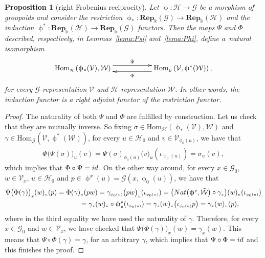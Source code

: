 \documentclass[11pt]{article}
\numberwithin{equation}{section}
\newtheorem{Proposition}[Theorem]{Proposition}
 { \theoremstyle{definition}
\newtheorem{Definition}[Theorem]{Definition}
\newtheorem{Remark}[Theorem]{Remark}
\newtheorem{Example}[Theorem]{Example}
 }
\renewcommand{\hom}[3]{\mathrm{Hom}_{\Sscript{#1}}\left(#2, #3\right)}
\newcommand{\Rep}[1]{\mathbf{Rep}_{\Sscript{\Bbbk}}(#1)}
\newcommand{\Go}{\cG_{\Sscript{0}}}
\newcommand{\Ho}{\cH_{\Sscript{0}}}
\newcommand{\Vx}{\cV_{\Sscript{x}}}
\newcommand{\cG}{{\mathcal G}}
\newcommand{\cH}{{\mathcal H}}
\newcommand{\cV}{{\mathcal V}}
\newcommand{\cW}{{\mathcal W}}
\newcommand{\Sscript}[1]{\scriptscriptstyle{#1}}
\begin{document}
\begin{Proposition}[right Frobenius reciprocity]\label{prop:FrobeniusR} Let $\upphi\colon \cH \to \cG$ be a morphism of groupoids and consider the restriction $\upphi_{*}\colon \Rep{\cG} \to \Rep{\cH}$ and the induction $\upphi^{*}\colon \Rep{\cH} \to \Rep{\cG}$ functors. Then the maps $\Psi$ and $\Phi$ described, respectively, in Lemmas~{\rm \ref{lema:Psi}} and~{\rm \ref{lema:Phi}}, define a~natural isomorphism
\begin{gather*}
\xymatrix@R=0pt{ \hom{\cH}{\upphi_{*}(\cV)}{\cW} \ar@<1ex>@{->}^-{\Psi}[rr] & & \hom{\cG}{\cV}{\upphi^*(\cW)},\ar@<1ex>@{->}^-{\Phi}[ll] }
\end{gather*}
for every $\cG$-representation $\cV$ and $\cH$-representation $\cW$. In other words, the induction functor is a right adjoint functor of the restriction functor.
\end{Proposition}
\begin{proof}The naturality of both $\Psi$ and $\Phi$ are fulfilled by construction. Let us check that they are mutually inverse. So fixing $\sigma \in \hom{\cH}{\upphi_*(\cV)}{\cW}$ and $\gamma \in \hom{\cG}{\cV}{\upphi^*(\cW)}$, for every $u \in \Ho$ and $v \in \cV_{\Sscript{\phi_0(u)}}$, we have that
\begin{gather*}
\Phi\big( \Psi(\sigma)\big)_{\Sscript{u}}(v) =\Psi(\sigma)_{\Sscript{\phi_0(u)}}\big( v\big)_{\Sscript{u}}(\iota_{\Sscript{\upphi_0(u)}}) = \sigma_{\Sscript{u}}(v),
\end{gather*}
which implies that $\Phi \circ \Psi= {\rm id}$. On the other way around, for every $x \in \Go$, $w \in \Vx$, $u \in \Ho$ and $p \in \upphi^{\Sscript{x}}(u)=\cG(x,\upphi_{\Sscript{0}}(u))$, we have that
\begin{gather*}
\Psi\big( \Phi(\gamma)\big)_{\Sscript{x}}(w)_{\Sscript{u}}(p) = \Phi(\gamma)_{\Sscript{u}}(p w) =\gamma_{\Sscript{\phi_{\Sscript{0}}(u)}}\big( p w\big)_{\Sscript{u}}(\iota_{\Sscript{\phi_0(u)}}) =
 \big( {\rm Nat}\big(\upphi^{\Sscript{p}}, \tilde{\cW}\big) \circ \gamma_{\Sscript{x}}\big)(w)_{\Sscript{u}}(\iota_{\Sscript{\phi_0(u)}})\\
\hphantom{\Psi\big( \Phi(\gamma)\big)_{\Sscript{x}}(w)_{\Sscript{u}}(p)}{}
 = \gamma_{\Sscript{x}}(w)_{\Sscript{u}} \circ \upphi^{\Sscript{p}}_{\Sscript{u}}(\iota_{\Sscript{\phi_0(u)}}) = \gamma_{\Sscript{x}}(w)_{\Sscript{u}}\big(\iota_{\Sscript{\phi_0(u)}} p\big) =
\gamma_{\Sscript{x}}(w)_{\Sscript{u}}(p),
\end{gather*}
where in the third equality we have used the naturality of $\gamma$. Therefore, for every $x \in \Go$ and $w \in \Vx$, we have checked that $\Psi\big( \Phi(\gamma)\big)_{\Sscript{x}}(w)= \gamma_{\Sscript{x}}(w)$. This means that $\Psi \circ \Phi (\gamma)= \gamma$, for an arbitrary $\gamma$, which implies that $\Psi \circ \Phi = {\rm id}$ and this finishes the proof.
\end{proof}
\end{document}
